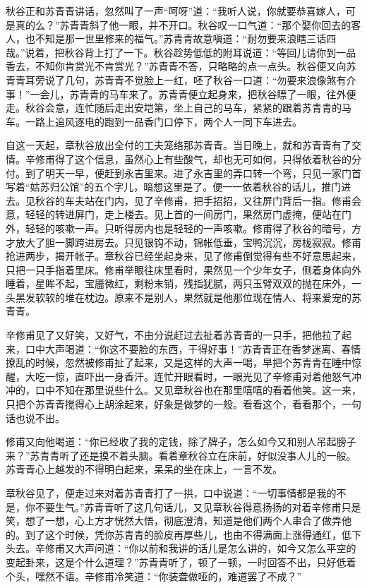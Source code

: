 \documentclass[12pt,UTF8]{ctexbook}
\begin{document}
{{{秋谷正和苏青青讲话，忽然叫了一声“呵呀”道：“我听人说，你就要恭喜嫁人，可是真的么？”苏青青斜了他一眼，并不开口。秋谷叹一口气道：“那个娶你回去的客人，也不知是那一世里修来的福气。”苏青青故意嗔道：“耐勿要来浪瞎三话四哉。”说着，把秋谷背上打了一下。秋谷趁势低低的附耳说道：“等回儿请你到一品香去，不知你肯赏光不肯赏光？”苏青青不答，只略略的点一点头。秋谷便又向苏青青耳旁说了几句，苏青青不觉脸上一红，呸了秋谷一口道：“勿要来浪像煞有介事！”一会儿，苏青青的马车来了。苏青青便立起身来，把秋谷瞟了一眼，往外便走。秋谷会意，连忙随后走出安垲第，坐上自己的马车，紧紧的跟着苏青青的马车。一路上追风逐电的跑到一品香门口停下，两个人一同下车进去。

自这一天起，章秋谷放出全付的工夫笼络那苏青青。当日晚上，就和苏青青有了交情。辛修甫得了这个信息，虽然心上有些酸气，却也无可如何，只得依着秋谷的分付。到了明天一早，便赶到永吉里来。进了永吉里的弄口转一个弯，只见一家门首写着“姑苏归公馆”的五个字儿，暗想这里是了。便一一依着秋谷的话儿，推门进去。见秋谷的车夫站在门内，见了辛修甫，把手招招，又往屏门背后一指。修甫会意，轻轻的转进屏门，走上楼去。见上首的一间房门，果然房门虚掩，便站在门外，轻轻的咳嗽一声。只听得房内也是轻轻的一声咳嗽。修甫得了秋谷的暗号，方才放大了胆一脚跨进房去。只见银钩不动，锦帐低垂，宝鸭沉沉，房栊寂寂。修甫抢进两步，揭开帐子。章秋谷已经坐起身来，见了修甫倒觉得有些不好意思起来，只把一只手指着里床。修甫举眼往床里看时，果然见一个少年女子，侧着身体向外睡着，星眸不起，宝靥微红，剩粉末销，残指犹腻，两只玉臂双双的抛在床外，一头黑发软软的堆在枕边。原来不是别人，果然就是他那位现在情人、将来爱宠的苏青青。

辛修甫见了又好笑，又好气，不由分说赶过去扯着苏青青的一只手，把他拉了起来，口中大声喝道：“你这不要脸的东西，干得好事！”苏青青正在香梦迷离、春情撩乱的时候，忽然被修甫扯了起来，又是这样的大声一喝，早把个苏青青在睡中惊醒，大吃一惊，直吓出一身香汗。连忙开眼看时，一眼光见了辛修甫对着他怒气冲冲的，口中不知在那里说些什么。又见章秋谷也在那里嘻嘻的看着他笑。这一来，只把个苏青青搅得心上胡涂起来，好象是做梦的一般。看看这个，看看那个，一句话也说不出。

修甫又向他喝道：“你已经收了我的定钱，除了牌子，怎么如今又和别人吊起膀子来？”苏青青听了还是摸不着头脑。看着章秋谷立在床前，好似没事人儿的一般。苏青青心上越发的不得明白起来，呆呆的坐在床上，一言不发。

章秋谷见了，便走过来对着苏青青打了一拱，口中说道：“一切事情都是我的不是，你不要生气。”苏青青听了这几句话儿，又见章秋谷得意扬扬的对着辛修甫只是笑，想了一想，心上方才恍然大悟，彻底澄清，知道是他们两个人串合了做弄他的。到了这个时候，凭你苏青青的脸皮再厚些儿，也由不得满面上涨得通红，低下头去。辛修甫又大声问道：“你以前和我讲的话儿是怎么讲的，如今又怎么平空的变起卦来，这是个什么道理？”苏青青听了，顿了一顿，一时回答不出，只好低着个头，嘿然不语。辛修甫冷笑道：“你装聋做哑的，难道罢了不成？”

}}}
\end{document}
